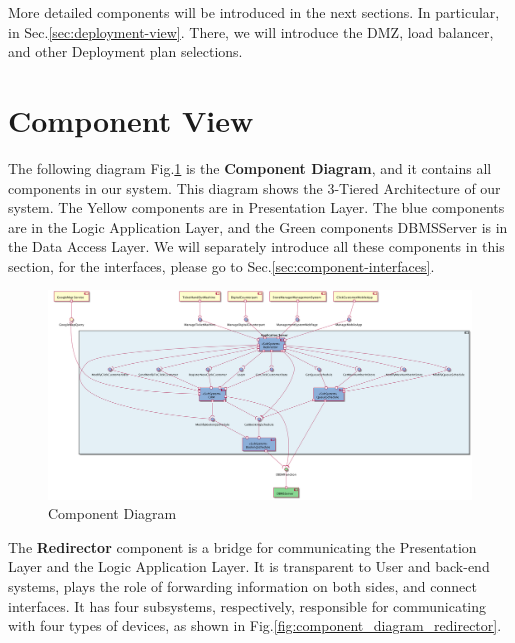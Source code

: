 \documentclass[a4paper,12pt]{report}
\begin{document}
More detailed components will be introduced in the next sections.
In particular, in Sec.\ref{sec:deployment-view}.
There, we will introduce the DMZ, load balancer, and other Deployment plan selections.


\section{Component View} \label{sec:ComponentView}
The following diagram Fig.\ref{fig:ComponentDiagram} is the \textbf{Component Diagram}, and it contains all components in our system.
This diagram shows the 3-Tiered Architecture of our system.
The Yellow components are in Presentation Layer.
The blue components are in the Logic Application Layer, and the Green components DBMSServer is in the Data Access Layer.
We will separately introduce all these components in this section, for the interfaces, please go to Sec.\ref{sec:component-interfaces}.

\begin{figure}[H]
	\includegraphics[width=1.2\textwidth]{component_diagram}
	\centering
	\caption{Component Diagram}
	\label{fig:ComponentDiagram}
\end{figure}


The \textbf{Redirector} component is a bridge for communicating the Presentation Layer and the Logic Application Layer.
It is transparent to User and back-end systems, plays the role of forwarding information on both sides, and connect interfaces.
It has four subsystems, respectively, responsible for communicating with four types of devices, as shown in Fig.\ref{fig:component_diagram_redirector}.
\end{document}
